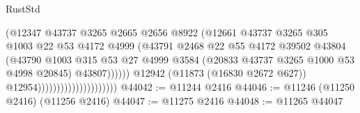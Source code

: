\begin{lexlean}{RustStd}
\begin{coremodule}
                                                  (@12347
                                                    @43737
                                                    @3265
                                                    @2665
                                                    @2656
                                                    @8922
                                                    (@12661
                                                      @43737
                                                      @3265
                                                      @305
                                                      @1003
                                                      @22
                                                      @53
                                                      @4172
                                                      @4999
                                                      (@43791
                                                        @2468
                                                        @22
                                                        @55
                                                        @4172
                                                        @39502
                                                        @43804
                                                        (@43790
                                                          @1003
                                                          @315
                                                          @53
                                                          @27
                                                          @4999
                                                          @3584
                                                          (@20833
                                                            @43737
                                                            @3265
                                                            @1000
                                                            @53
                                                            @4998
                                                            @20845)
                                                          @43807))))))
                                              @12942
                                              (@11873 (@16830 @2672 @627))
                                              @12954)))))))))))))))))))))
@44042 := @11244 @2416
@44046 := @11246 (@11250 @2416) (@11256 @2416)
@44047 := @11275 @2416
@44048 := @11265 @44047

\end{coremodule}
\end{lexlean}
